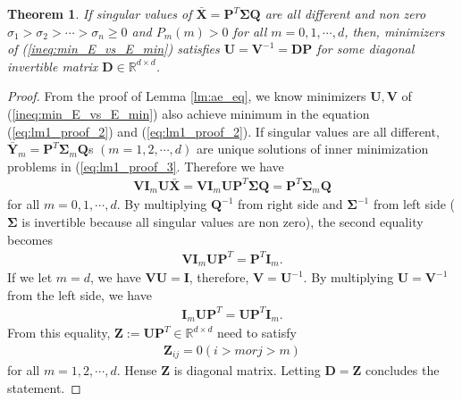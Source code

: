 \documentclass{article}
\newtheorem{theorem}{Theorem}
\begin{document}
    \begin{theorem}
      \label{th:svd}
      If singular values of $\bar{\mathbf{X}} = \mathbf{P}^T \mathbf{\Sigma} \mathbf{Q}$ are all different and non zero $\sigma_1 > \sigma_2 > \cdots > \sigma_n \geq 0$ and $P_m(m) > 0$ for all $m = 0, 1, \cdots, d$, then, minimizers of (\ref{ineq:min_E_vs_E_min}) satisfies $\mathbf{U} = \mathbf{V}^{-1} = \mathbf{D} \mathbf{P}$ for some diagonal invertible matrix $\mathbf{D} \in \mathbb{R}^{d \times d}$.
    \end{theorem}
    \begin{proof}
    From the proof of Lemma \ref{lm:ae_eq}, we know minimizers $\mathbf{U}, \mathbf{V}$ of (\ref{ineq:min_E_vs_E_min}) also achieve minimum in the equation (\ref{eq:lm1_proof_2}) and  (\ref{eq:lm1_proof_2}). If singular values are all different, $\bar{\mathbf{Y}}_m = \mathbf{P}^T \mathbf{\Sigma}_m \mathbf{Q}$s $(m=1,2,\cdots,d)$ are unique solutions of inner minimization problems in (\ref{eq:lm1_proof_3}. Therefore we have
    \begin{align}
        \mathbf{V} \mathbf{I}_m \mathbf{U} \bar{\mathbf{X}}
        = \mathbf{V} \mathbf{I}_m \mathbf{U} \mathbf{P}^T \mathbf{\Sigma} \mathbf{Q}
        = \mathbf{P}^T \mathbf{\Sigma}_m \mathbf{Q} \nonumber
    \end{align}
    for all $m=0, 1, \cdots, d$.
    By multiplying $\mathbf{Q}^{-1}$ from right side and $\mathbf{\Sigma}^{-1}$ from left side ($\mathbf{\Sigma}$ is invertible because all singular values are non zero), the second equality becomes
    \begin{align}
        \mathbf{V} \mathbf{I}_m \mathbf{U} \mathbf{P}^T
        = \mathbf{P}^T \mathbf{I}_m.
    \end{align}
    If we let $m = d$, we have $\mathbf{V} \mathbf{U} = \mathbf{I}$, therefore, $\mathbf{V} = \mathbf{U}^{-1}$. 
    By multiplying $\mathbf{U} = \mathbf{V}^{-1}$ from the left side, we have
    \begin{align}
        \mathbf{I}_m \mathbf{U} \mathbf{P}^T
        = \mathbf{U} \mathbf{P}^T \mathbf{I}_m.
    \end{align}
    From this equality, $\mathbf{Z} := \mathbf{U} \mathbf{P}^T \in \mathbb{R}^{d \times d}$ need to satisfy
    \begin{align}
        \mathbf{Z}_{ij} = 0 (i > m or j > m)
    \end{align}
    for all $m = 1, 2, \cdots, d$. Hense $\mathbf{Z}$ is diagonal matrix. Letting $\mathbf{D} = \mathbf{Z}$ concludes the statement.
    \end{proof}
    
\end{document}
